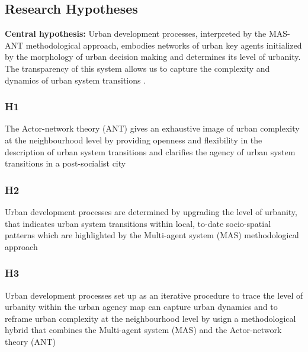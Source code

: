 \documentclass[11pt]{report}
\begin{document}
\subsection{Research Hypotheses}
\textbf{Central hypothesis:} Urban development processes, interpreted by the MAS-ANT methodological approach, embodies networks of urban key agents initialized by the morphology of urban decision making and determines its level of urbanity.
The transparency of this system allows us to  capture the complexity and dynamics of urban system transitions . 

\subsubsection{H1}

The Actor-network theory (ANT) gives an exhaustive image of urban complexity at the neighbourhood level by providing openness and flexibility in the description of urban system transitions and clarifies the agency of urban system transitions in a post-socialist city

\subsubsection{H2}

Urban development processes are determined by upgrading the  level of urbanity, that indicates urban system transitions within local, to-date socio-spatial patterns which are highlighted by the Multi-agent system (MAS) methodological approach 

\subsubsection{H3}

Urban development processes set up as an iterative procedure to trace the level of urbanity within the urban agency map can capture urban dynamics and to reframe urban complexity at the neighbourhood level by usign a methodological hybrid that combines the Multi-agent system (MAS) and the Actor-network theory (ANT)
\end{document}
